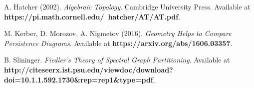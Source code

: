 \documentclass[12pt,a4paper]{amsart}
\numberwithin{equation}{section}
\theoremstyle{plain}
\theoremstyle{definition}
\begin{document}
\begin{thebibliography}{99}

 A. Hatcher (2002). \textit{Algebraic Topology}. Cambridge University Press. Available at \textbf{https://pi.math.cornell.edu/~hatcher/AT/AT.pdf}.

 M. Kerber, D. Morozov, A. Nigmetov (2016). \textit{Geometry Helps to Compare Persistence Diagrams}. Available at \textbf{https://arxiv.org/abs/1606.03357}.

 B. Slininger. \textit{Fiedler's Theory of Spectral Graph Partitioning}. Available at \textbf{http://citeseerx.ist.psu.edu/viewdoc/download?doi=10.1.1.592.1730\&rep=rep1\&type=pdf}.

\end{thebibliography}
\end{document}
